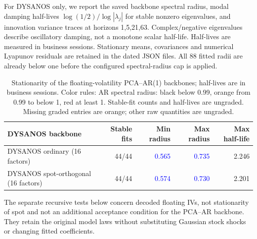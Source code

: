 \documentclass[11pt]{article}
\begin{document}
For DYSANOS only, we report the saved backbone spectral radius, modal damping half-lives $\log(1/2)/\log|\lambda_j|$ for stable nonzero eigenvalues, and innovation variance traces at horizons 1,5,21,63. Complex/negative eigenvalues describe oscillatory damping, not a monotone scalar half-life. Half-lives are measured in business sessions. Stationary means, covariances and numerical Lyapunov residuals are retained in the dated JSON files. All 88 fitted radii are already below one before the configured spectral-radius cap is applied.

\begin{table}[H]\centering\small\setlength{\tabcolsep}{4pt}
\caption{Stationarity of the floating-volatility PCA--AR(1) backbones; half-lives are in business sessions. Color rules: AR spectral radius: black below 0.99, orange from 0.99 to below 1, red at least 1. Stable-fit counts and half-lives are ungraded. Missing graded entries are orange; other raw quantities are ungraded.}\label{tab:ar-stationarity}
\begin{tabular}{@{}lrrrr@{}}
\toprule
DYSANOS backbone & Stable fits & Min radius & Max radius & Max half-life \\
\midrule
DYSANOS ordinary (16 factors) & 44/44 & \textcolor{blue}{0.565} & \textcolor{blue}{0.735} & 2.246 \\
DYSANOS spot-orthogonal (16 factors) & 44/44 & \textcolor{blue}{0.574} & \textcolor{blue}{0.730} & 2.201 \\
\bottomrule\end{tabular}\end{table}

The separate recursive tests below concern decoded floating IVs, not stationarity of spot and not an additional acceptance condition for the PCA--AR backbone. They retain the original model laws without substituting Gaussian stock shocks or changing fitted coefficients.
\end{document}
